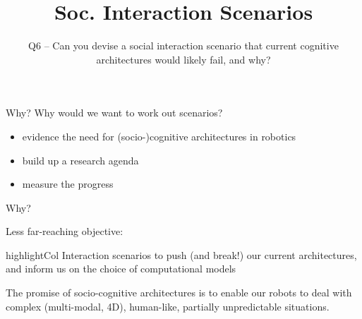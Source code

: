 \documentclass[compress]{beamer}
\title{Soc. Interaction Scenarios}
\subtitle{Q6 -- Can you devise a social interaction scenario that current
cognitive architectures would likely fail, and why?}
\date{}
\author{}
\institute{\texttt{[image: plymouth-logo]}}
\newcommand{\highlight}[1]{%
    \begin{beamercolorbox}[wd=\linewidth,dp=0.7ex]{highlightCol}%
    #1%
    \end{beamercolorbox}%
}%
\begin{document}
\maketitle

\begin{frame}{Why?}
    Why would we want to work out scenarios?

    \begin{itemize}
        \item {\Medium evidence the need} for (socio-)cognitive architectures in
            robotics
        \item {\Medium build up a research agenda}
        \item {\Medium measure the progress}
    \end{itemize}


\end{frame}

\begin{frame}{Why?}

    Less far-reaching objective:
    \vspace{1em}

    \highlight{\centering Interaction scenarios to {\Medium push (and break!)
    our current architectures}, and {\Medium inform} us on the choice of computational models}

\end{frame}

\begin{frame}{}

    The promise of socio-cognitive architectures is to enable our
    robots to {\Medium deal with complex (multi-modal, 4D), human-like, partially unpredictable
    situations}.

    \vspace{2em}


\end{frame}
\end{document}
